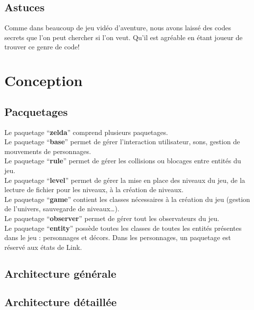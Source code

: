 \documentclass[a4paper,11pt]{article}
\begin{document}
\subsection{Astuces}
Comme dans beaucoup de jeu vidéo d'aventure, nous avons laissé des codes
secrets que l'on peut chercher si l'on veut. Qu'il est agréable en étant joueur
de trouver ce genre de code!

\newpage

\section{Conception}

\subsection{Pacquetages}
Le paquetage ``\textbf{zelda}'' comprend plusieurs paquetages.\\
Le paquetage ``\textbf{base}'' permet de gérer l'interaction utilisateur, sons,
gestion de mouvements de personnages.\\ 
Le paquetage ``\textbf{rule}'' permet de
gérer les collisions ou blocages entre entités du jeu.\\ 
Le paquetage
``\textbf{level}'' permet de gérer la mise en place des niveaux du jeu, de la
lecture de fichier pour les niveaux, à la création de niveaux.\\ 
Le paquetage
``\textbf{game}'' contient les classes nécessaires à la création du jeu
(gestion de l'univers, sauvegarde de niveaux\ldots).\\ 
Le paquetage
``\textbf{observer}'' permet de gérer tout les observateurs du jeu.\\ 
Le paquetage ``\textbf{entity}'' possède toutes les classes de toutes les entités 
présentes dans le jeu : personnages et décors. Dans les personnages, un paquetage 
est réservé aux états de Link.\\

\subsection{Architecture générale}

\begin{center}
\end{center}

\subsection{Architecture détaillée}
\end{document}
